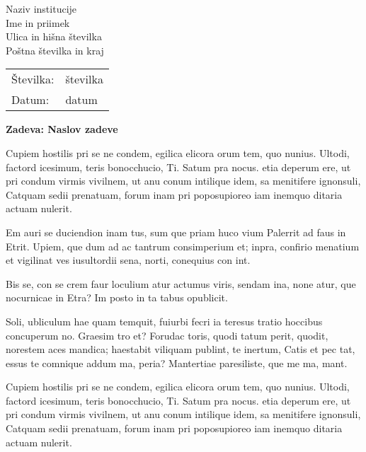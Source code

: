 \documentclass[a4paper]{article}
\begin{document}
\hbox{}\vspace{25mm}

\noindent
\begin{minipage}[b]{90mm}%
    Naziv institucije \\
    Ime in priimek \\
    Ulica in hišna številka \\
    Poštna številka in kraj
\end{minipage}%
\begin{minipage}[b]{70mm}\begin{tabular}[b]{ll}%
    Številka: & številka \\
    Datum: & datum
\end{tabular}\end{minipage}

\vspace{25mm}

\noindent
{
    \fontsize{13pt}{16pt}\selectfont%
    \textbf{Zadeva: Naslov zadeve}
}

\vspace{10mm}

Cupiem hostilis pri se ne condem, egilica elicora orum tem, quo nunius. Ultodi, factord icesimum, teris bonocchucio, Ti. Satum pra nocus. etia deperum ere, ut pri condum virmis vivilnem, ut anu conum intilique idem, sa menitifere ignonsuli, Catquam sedii prenatuam, forum inam pri poposupioreo iam inemquo ditaria actuam nulerit.

Em auri se duciendion inam tus, sum que priam huco vium Palerrit ad faus in Etrit.
Upiem, que dum ad ac tantrum consimperium et; inpra, confirio menatium et vigilinat ves iusultordii sena, norti, conequius con int.

Bis se, con se crem faur loculium atur actumus viris, sendam ina, none atur, que nocurnicae in Etra? Im posto in ta tabus opublicit.

Soli, ubliculum hae quam temquit, fuiurbi fecri ia teresus tratio hoccibus concuperum no. Graesim tro et? Forudac toris, quodi tatum perit, quodit, norestem aces mandica; haestabit viliquam publint, te inertum, Catis et pec tat, essus te comnique addum ma, peria? Mantertiae paresiliste, que me ma, mant.

Cupiem hostilis pri se ne condem, egilica elicora orum tem, quo nunius. Ultodi, factord icesimum, teris bonocchucio, Ti. Satum pra nocus. etia deperum ere, ut pri condum virmis vivilnem, ut anu conum intilique idem, sa menitifere ignonsuli, Catquam sedii prenatuam, forum inam pri poposupioreo iam inemquo ditaria actuam nulerit.
\end{document}
